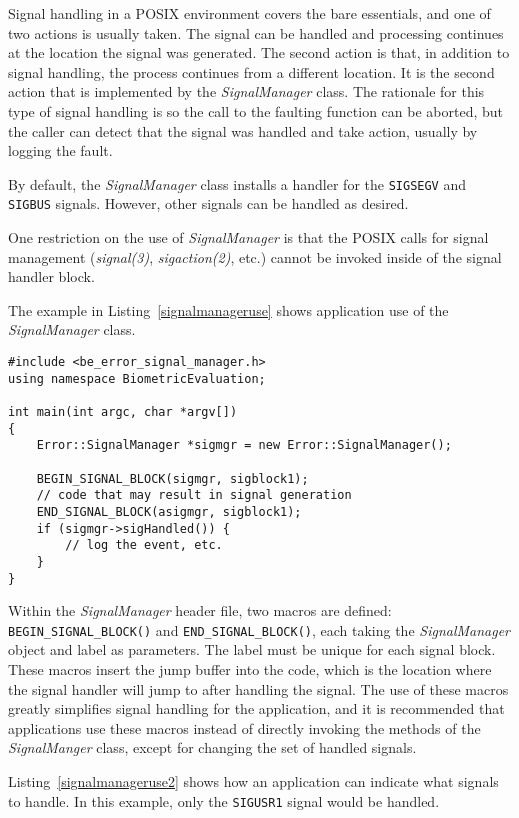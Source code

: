 Signal handling in a POSIX environment covers the bare essentials, and one of
two actions is usually taken. The signal can be handled and processing
continues at the location the signal was generated. The second action is
that, in addition to signal handling, the process continues from a different
location. It is the second action that is implemented by the
{\em SignalManager} class. The rationale for this type of signal handling is
so the call to the faulting function can be aborted, but the caller can
detect that the signal was handled and take action, usually by logging the
fault.

By default, the {\em SignalManager} class installs a handler for the
{\tt SIGSEGV} and {\tt SIGBUS} signals. However, other signals can be
handled as desired.

One restriction on the use of {\em SignalManager} is that the POSIX calls for
signal management ({\em signal(3)}, {\em sigaction(2)}, etc.) cannot be
invoked inside of the signal handler block.

The example in Listing~\ref{signalmanageruse} shows application use of the
{\em SignalManager} class.

\lstset{language=c++}
\begin{lstlisting}[caption={Using the SignalManger}, label=signalmanageruse]
#include <be_error_signal_manager.h>
using namespace BiometricEvaluation;

int main(int argc, char *argv[])
{
	Error::SignalManager *sigmgr = new Error::SignalManager();

	BEGIN_SIGNAL_BLOCK(sigmgr, sigblock1);
	// code that may result in signal generation
	END_SIGNAL_BLOCK(asigmgr, sigblock1);
	if (sigmgr->sigHandled()) {
		// log the event, etc.
	}
}
\end{lstlisting}

Within the {\em SignalManager} header file, two macros are defined:
{\tt BEGIN\_SIGNAL\_BLOCK()} and {\tt END\_SIGNAL\_BLOCK()}, each taking the
{\em SignalManager} object and label as parameters. The label must be unique
for each signal block. These macros insert the
jump buffer into the code, which is the location where the signal handler will
jump to after handling the signal. The use of these macros greatly simplifies
signal handling for the application, and it is recommended that applications
use these macros instead of directly invoking the methods of the
{\em SignalManger} class, except for changing the set of handled signals.

Listing~\ref{signalmanageruse2} shows how an application can indicate what
signals to handle. In this example, only the {\tt SIGUSR1} signal would
be handled.

